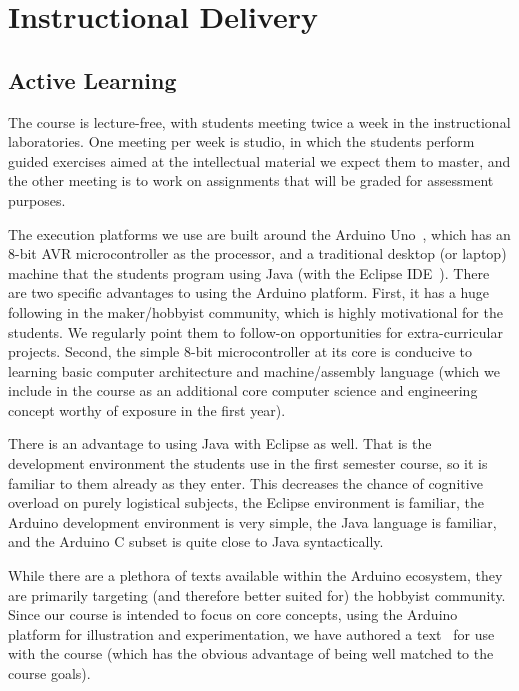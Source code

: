 \section{Instructional Delivery}
\label{sec:delivery}

\subsection{Active Learning}



The course is lecture-free, with students meeting twice a week in the
instructional laboratories.  One meeting per week is studio, in which the
students perform guided exercises aimed at the intellectual material we
expect them to master, and the other meeting is to work on assignments
that will be graded for assessment purposes.





The execution platforms we use are built around the Arduino Uno~\cite{arduino},
which has an 8-bit AVR microcontroller as the processor,
and a traditional desktop (or laptop) machine that the
students program using Java (with the Eclipse IDE~\cite{eclipse}).
There are two specific advantages to using the Arduino platform.
First, it has a huge following in the maker/hobbyist community, which
is highly motivational for the students.  We regularly point them to
follow-on opportunities for extra-curricular projects.
Second, the simple 8-bit microcontroller at its core is conducive to
learning basic computer architecture and machine/assembly language
(which we include in the course as an additional core computer
science and engineering concept worthy of exposure in the first year).

There is an advantage to using Java with Eclipse as well. That is the
development environment the students use in the first semester course, so
it is familiar to them already as they enter.  This decreases the chance
of cognitive overload on purely logistical subjects, the Eclipse environment
is familiar, the Arduino development environment is very simple, the
Java language is familiar, and the Arduino C subset is quite close to
Java syntactically.

While there are a plethora of texts available within the Arduino
ecosystem, they are primarily targeting (and therefore better suited for)
the hobbyist community. Since
our course is intended to focus on core concepts, using the
Arduino platform for illustration and experimentation, we have authored
a text~\cite{cc17} for use with the course (which has the obvious
advantage of being well matched to the course goals).

